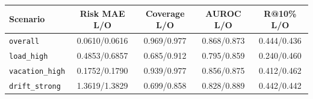 \begin{tabular}{lcccc}
\hline
Scenario & Risk MAE L/O & Coverage L/O & AUROC L/O & R@10\% L/O \\
\hline
\texttt{overall} & 0.0610/0.0616 & 0.969/0.977 & 0.868/0.873 & 0.444/0.436 \\
\texttt{load\_high} & 0.4853/0.6857 & 0.685/0.912 & 0.795/0.859 & 0.240/0.460 \\
\texttt{vacation\_high} & 0.1752/0.1790 & 0.939/0.977 & 0.856/0.875 & 0.412/0.462 \\
\texttt{drift\_strong} & 1.3619/1.3829 & 0.699/0.858 & 0.828/0.889 & 0.442/0.442 \\
\hline
\end{tabular}
